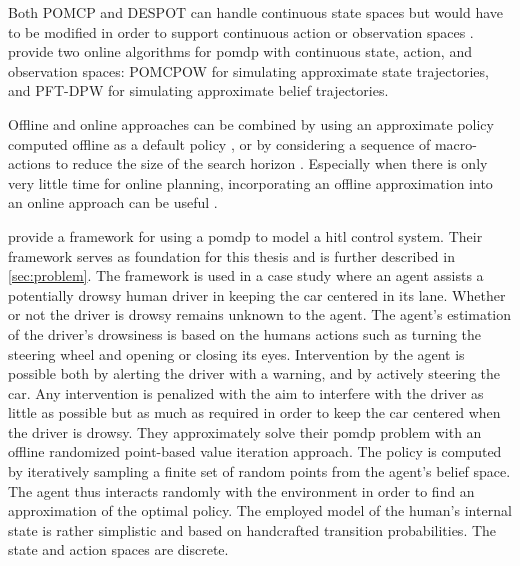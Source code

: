 Both POMCP and DESPOT can handle continuous state spaces but would have to be modified in order to support continuous action or observation spaces \parencite{online_pomdp_cont}. \citeauthor{online_pomdp_cont} provide two online algorithms for \gls{pomdp} with continuous state, action, and observation spaces: POMCPOW for simulating approximate state trajectories, and PFT-DPW for simulating approximate belief trajectories.

Offline and online approaches can be combined by using an approximate policy computed offline as a default policy \parencite{comb_online_offline}, or by considering a sequence of macro-actions to reduce the size of the search horizon \parencite{macro_actions}. Especially when there is only very little time for online planning, incorporating an offline approximation into an online approach can be useful \parencite{online_pomdp}.

\cite{hitl_pomdp} provide a framework for using a \gls{pomdp} to model a \gls{hitl} control system. Their framework serves as foundation for this thesis and is further described in \cref{sec:problem}. The framework is used in a case study where an agent assists a potentially drowsy human driver in keeping the car centered in its lane. Whether or not the driver is drowsy remains unknown to the agent. The agent's estimation of the driver's drowsiness is based on the humans actions such as turning the steering wheel and opening or closing its eyes. Intervention by the agent is possible both by alerting the driver with a warning, and by actively steering the car. Any intervention is penalized with the aim to interfere with the driver as little as possible but as much as required in order to keep the car centered when the driver is drowsy. They approximately solve their \gls{pomdp} problem with an offline randomized point-based value iteration approach. The policy is computed by iteratively sampling a finite set of random points from the agent's belief space. The agent thus interacts randomly with the environment in order to find an approximation of the optimal policy. The employed model of the human's internal state is rather simplistic and based on handcrafted transition probabilities. The state and action spaces are discrete.

